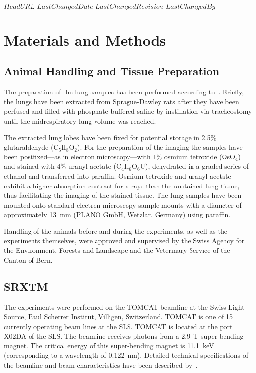 \svnidlong
{$HeadURL$}
{$LastChangedDate$}
{$LastChangedRevision$}
{$LastChangedBy$}

\begin{center}
\end{center}

\section{Materials and Methods}
\label{sec:materials and methods}
\subsection{Animal Handling and Tissue Preparation}
The preparation of the lung samples has been performed according to~\citet{Schittny1997,Schittny1998}. Briefly, the lungs have been extracted from Sprague-Dawley rats after they have been perfused and filled with phosphate buffered saline by instillation via tracheostomy until the midrespiratory lung volume was reached.

The extracted lung lobes have been fixed for potential storage in 2.5\% glutaraldehyde (C$_5$H$_8$O$_2$). For the preparation of the imaging the samples have been postfixed---as in electron microscopy---with 1\% osmium tetroxide (OsO$_4$) and stained with 4\% uranyl acetate (C$_4$H$_6$O$_6$U), dehydrated in a graded series of ethanol and transferred into paraffin.  Osmium tetroxide and uranyl acetate exhibit a higher absorption contrast for x-rays than the unstained lung tissue, thus facilitating the imaging of the stained tissue. The lung samples have been mounted onto standard electron microscopy sample mounts with a diameter of approximately \SI{13}{\milli\meter} (PLANO GmbH, Wetzlar, Germany) using paraffin.

Handling of the animals before and during the experiments, as well as the experiments themselves, were approved and supervised by the Swiss Agency for the Environment, Forests and Landscape and the Veterinary Service of the Canton of Bern.

\subsection{SRXTM}
The experiments were performed on the TOMCAT beamline at the Swiss Light Source, Paul Scherrer Institut, Villigen, Switzerland. TOMCAT is one of 15 currently operating beam lines at the SLS. TOMCAT is located at the port X02DA of the SLS. The beamline receives photons from a \SI{2.9}{\tesla} super-bending magnet. The critical energy of this super-bending magnet is \SI{11.1}{\kilo\electronvolt} (corresponding to a wavelength of \SI{0.122}{\nano\meter}). Detailed technical specifications of the beamline and beam characteristics have been described by~\citet{Stampanoni2006a,Stampanoni2007}.

